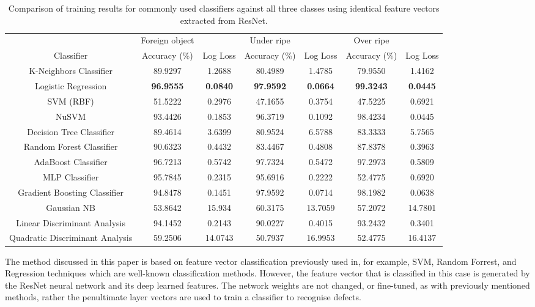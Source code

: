 \documentclass[conference]{IEEEtran}
\begin{document}
\begin{table*}
	\centering
	\caption{Comparison of training results for commonly used classifiers against all three classes using identical feature vectors extracted from ResNet.}
	\label{tab:classifiers}
	\begin{tabularx}{0.85\textwidth}{ccccccc}
		\toprule
		& Foreign object &          & Under ripe    &          & Over ripe     &           \\  
		Classifier & Accuracy (\%)  & Log Loss & Accuracy (\%) & Log Loss & Accuracy (\%) & Log Loss  \\ 
		\midrule
		K-Neighbors Classifier          & 89.9297  & 1.2688 & 80.4989 & 1.4785 & 79.9550 & 1.4162 \\[6pt] 
		Logistic Regression	            & \textbf{96.9555}  & \textbf{0.0840} & \textbf{97.9592} & \textbf{0.0664} &  \textbf{99.3243} & \textbf{0.0445} \\[6pt]
		SVM (RBF)	                    & 51.5222  & 0.2976 & 47.1655 & 0.3754 & 47.5225 & 0.6921 \\[6pt]
		NuSVM	                        & 93.4426  & 0.1853 & 96.3719 & 0.1092 & 98.4234 & 0.0445 \\[6pt]
		Decision Tree Classifier	    & 89.4614  & 3.6399 & 80.9524 & 6.5788 & 83.3333 & 5.7565 \\[6pt]
		Random Forest Classifier	    & 90.6323  & 0.4432 & 83.4467 & 0.4808 & 87.8378 & 0.3963 \\[6pt]
		AdaBoost Classifier	            & 96.7213  & 0.5742 & 97.7324 & 0.5472 & 97.2973 & 0.5809 \\[6pt]
		MLP Classifier	                & 95.7845  & 0.2315 & 95.6916 & 0.2222 & 52.4775 & 0.6920 \\[6pt]
		Gradient Boosting Classifier	& 94.8478  & 0.1451 & 97.9592 & 0.0714 & 98.1982 & 0.0638 \\[6pt]
		Gaussian NB	                    & 53.8642  & 15.934 & 60.3175 & 13.7059 & 57.2072 & 14.7801 \\[6pt]
		Linear Discriminant Analysis	& 94.1452  & 0.2143 & 90.0227 & 0.4015 & 93.2432 & 0.3401 \\[6pt]
		Quadratic Discriminant Analysis	& 59.2506  & 14.0743 & 50.7937 & 16.9953 & 52.4775 & 16.4137 \\[6pt]
		\bottomrule 
	\end{tabularx}
\end{table*}





The method discussed in this paper is based on feature vector classification previously used in, for example, SVM, Random Forrest, and Regression techniques which are well-known classification methods. However, the feature vector that is classified in this case is generated by the ResNet neural network and its deep learned features. The network weights are not changed, or fine-tuned, as with previously mentioned methods, rather the penultimate layer vectors are used to train a classifier to recognise defects. 
\end{document}
